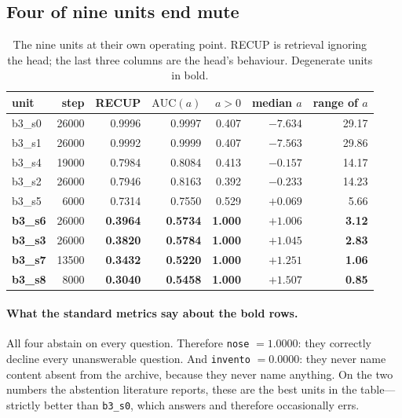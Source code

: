 \documentclass[11pt,a4paper]{article}
\begin{document}
\subsection{Four of nine units end mute}
\label{sec:mudas}

\begin{table}[h]
\centering
\caption{The nine units at their own operating point. RECUP is retrieval ignoring the head; the last
three columns are the head's behaviour. Degenerate units in bold.}
\begin{tabular}{lrrrrrr}
\toprule
unit & step & RECUP & $\mathrm{AUC}(a)$ & $a > 0$ & median $a$ & range of $a$ \\
\midrule
b3\_s0 & 26000 & 0.9996 & 0.9997 & 0.407 & $-7.634$ & 29.17 \\
b3\_s1 & 26000 & 0.9992 & 0.9999 & 0.407 & $-7.563$ & 29.86 \\
b3\_s4 & 19000 & 0.7984 & 0.8084 & 0.413 & $-0.157$ & 14.17 \\
b3\_s2 & 26000 & 0.7946 & 0.8163 & 0.392 & $-0.233$ & 14.23 \\
b3\_s5 & 6000  & 0.7314 & 0.7550 & 0.529 & $+0.069$ & 5.66 \\
\midrule
\textbf{b3\_s6} & 26000 & \textbf{0.3964} & \textbf{0.5734} & \textbf{1.000} & $+1.006$ & \textbf{3.12} \\
\textbf{b3\_s3} & 26000 & \textbf{0.3820} & \textbf{0.5784} & \textbf{1.000} & $+1.045$ & \textbf{2.83} \\
\textbf{b3\_s7} & 13500 & \textbf{0.3432} & \textbf{0.5220} & \textbf{1.000} & $+1.251$ & \textbf{1.06} \\
\textbf{b3\_s8} & 8000  & \textbf{0.3040} & \textbf{0.5458} & \textbf{1.000} & $+1.507$ & \textbf{0.85} \\
\bottomrule
\end{tabular}
\label{tab:nueve}
\end{table}

\paragraph{What the standard metrics say about the bold rows.} All four abstain on every question.
Therefore \texttt{nose} $=1.0000$: they correctly decline every unanswerable question. And
\texttt{invento} $=0.0000$: they never name content absent from the archive, because they never name
anything. On the two numbers the abstention literature reports, these are the best units in the
table---strictly better than \texttt{b3\_s0}, which answers and therefore occasionally errs.
\end{document}
